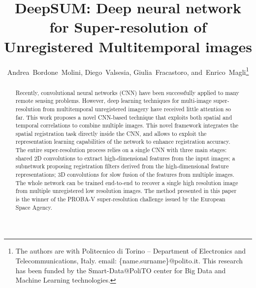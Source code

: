 \documentclass[journal]{IEEEtran}
\begin{document}
\title{DeepSUM: Deep neural network for Super-resolution of Unregistered Multitemporal images}


\author{Andrea~Bordone~Molini,
        Diego~Valsesia,
        Giulia~Fracastoro,
        and~Enrico~Magli\thanks{The authors are with Politecnico di Torino -- Department of Electronics and Telecommunications, Italy. email: \{name.surname\}@polito.it. This research has been funded by the Smart-Data@PoliTO center
for Big Data and Machine Learning technologies.}}




















\maketitle

\begin{abstract}


Recently, convolutional neural networks (CNN) have been successfully applied to many remote sensing problems. However, deep learning techniques for multi-image super-resolution from multitemporal unregistered imagery have received little attention so far. 
This work proposes a novel CNN-based technique that exploits both spatial and temporal correlations to combine multiple images. This novel framework integrates the spatial registration task directly inside the CNN, and allows to exploit the representation learning capabilities of the network to enhance registration accuracy. The entire super-resolution process relies on a single CNN with three main stages: shared 2D convolutions to extract high-dimensional features from the input images; a subnetwork proposing registration filters derived from the high-dimensional feature representations; 3D convolutions for slow fusion of the features from multiple images. The whole network can be trained end-to-end to recover a single high resolution image from multiple unregistered low resolution images. 
The method presented in this paper is the winner of the PROBA-V super-resolution challenge issued by the European Space Agency.

\end{abstract}
\end{document}
